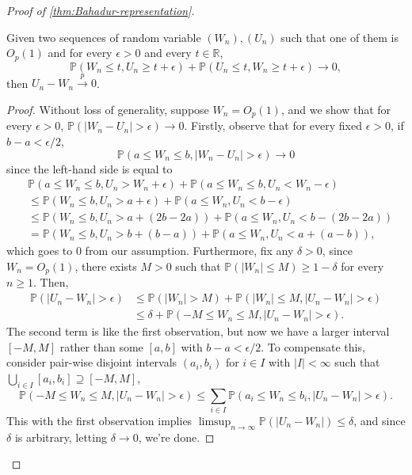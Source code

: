 \begin{proof}[Proof of \autoref{thm:Bahadur-representation}]
	\begin{lemma}\label{lma:Bahadur-representation}
		Given two sequences of random variable \((W_n), (U_n)\) such that one of them is \(O_p(1)\) and for every \(\epsilon > 0\) and every \(t \in \mathbb{R} \),
		\[
			\mathbb{P} (W_n \leq t, U_n \geq t+\epsilon ) + \mathbb{P} (U_n \leq t, W_n \geq t + \epsilon ) \to 0,
		\]
		then \(U_n - W_n \overset{p}{\to} 0\).
	\end{lemma}
	\begin{proof}
		Without loss of generality, suppose \(W_n = O_p(1)\), and we show that for every \(\epsilon > 0\), \(\mathbb{P} (\vert W_n - U_n \vert > \epsilon ) \to 0\). Firstly, observe that for every fixed \(\epsilon > 0\), if \(b - a < \epsilon / 2\),
		\[
			\mathbb{P} (a \leq W_n \leq b , \vert W_n - U_n \vert > \epsilon ) \to 0
		\]
		since the left-hand side is equal to
		\[
			\begin{split}
				 & \mathbb{P} (a \leq W_n \leq b, U_n > W_n + \epsilon ) + \mathbb{P} (a \leq W_n \leq b, U_n < W_n - \epsilon ) \\
				 & \leq \mathbb{P} (W_n \leq b, U_n > a + \epsilon ) + \mathbb{P} (a \leq W_n , U_n < b - \epsilon )             \\
				 & \leq \mathbb{P} (W_n \leq b, U_n > a + (2b - 2a) ) + \mathbb{P} (a \leq W_n , U_n < b - (2b - 2a) )           \\
				 & = \mathbb{P} (W_n \leq b, U_n > b + (b - a) ) + \mathbb{P} (a \leq W_n , U_n < a + (a - b) ),
			\end{split}
		\]
		which goes to \(0\) from our assumption. Furthermore, fix any \(\delta > 0\), since \(W_n = O_p(1)\), there exists \(M > 0\) such that \(\mathbb{P} (\vert W_n \vert \leq M) \geq 1 - \delta \) for every \(n \geq 1\). Then,
		\[
			\begin{split}
				\mathbb{P} (\vert U_n - W_n \vert > \epsilon )
				 & \leq \mathbb{P} (\vert W_n \vert > M) + \mathbb{P} (\vert W_n \vert \leq M, \vert U_n - W_n \vert > \epsilon ) \\
				 & \leq \delta + \mathbb{P} (-M \leq W_n \leq M , \vert U_n - W_n \vert > \epsilon ).
			\end{split}
		\]
		The second term is like the first observation, but now we have a larger interval \([-M, M]\) rather than some \([a, b]\) with \(b - a < \epsilon / 2\). To compensate this, consider pair-wise disjoint intervals \((a_i, b_i)\) for \(i \in I\) with \(\vert I \vert < \infty \) such that \(\bigcup_{i\in I} [a_i, b_i] \supseteq [-M, M]\),
		\[
			\mathbb{P} (-M \leq W_n \leq M , \vert U_n - W_n \vert > \epsilon )
			\leq \sum_{i\in I} \mathbb{P} (a_i \leq W_n \leq b_i, \vert U_n - W_n \vert > \epsilon ).
		\]
		This with the first observation implies \(\limsup_{n \to \infty} \mathbb{P} (\vert U_n - W_n \vert ) \leq \delta\), and since \(\delta \) is arbitrary, letting \(\delta \to 0\), we're done.
	\end{proof}


\end{proof}
